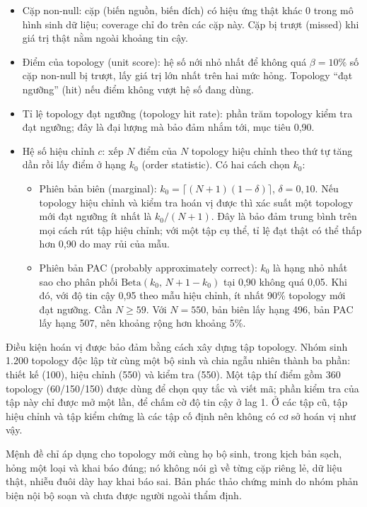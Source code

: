 \documentclass[11pt,a4paper]{article}
\providecommand{\tightlist}{\setlength{\itemsep}{0pt}\setlength{\parskip}{0pt}}
\begin{document}
\begin{itemize}
\tightlist
\item
  Cặp non-null: cặp (biến nguồn, biến đích) có hiệu ứng thật khác 0 trong mô hình sinh dữ liệu; coverage chỉ đo trên các cặp này. Cặp bị trượt (missed) khi giá trị thật nằm ngoài khoảng tin cậy.
\item
  Điểm của topology (unit score): hệ số nới nhỏ nhất để không quá $\beta=10\%$ số cặp non-null bị trượt, lấy giá trị lớn nhất trên hai mức hỏng. Topology ``đạt ngưỡng'' (hit) nếu điểm không vượt hệ số đang dùng.
\item
  Tỉ lệ topology đạt ngưỡng (topology hit rate): phần trăm topology kiểm tra đạt ngưỡng; đây là đại lượng mà bảo đảm nhắm tới, mục tiêu 0,90.
\item
  Hệ số hiệu chỉnh $c$: xếp $N$ điểm của $N$ topology hiệu chỉnh theo thứ tự tăng dần rồi lấy điểm ở hạng $k_0$ (order statistic). Có hai cách chọn $k_0$:

  \begin{itemize}
  \tightlist
  \item
    Phiên bản biên (marginal): $k_0=\lceil (N+1)(1-\delta)\rceil$, $\delta=0{,}10$. Nếu topology hiệu chỉnh và kiểm tra hoán vị được thì xác suất một topology mới đạt ngưỡng ít nhất là $k_0/(N+1)$. Đây là bảo đảm trung bình trên mọi cách rút tập hiệu chỉnh; với một tập cụ thể, tỉ lệ đạt thật có thể thấp hơn 0,90 do may rủi của mẫu.
  \item
    Phiên bản PAC (probably approximately correct): $k_0$ là hạng nhỏ nhất sao cho phân phối $\mathrm{Beta}(k_0,\,N+1-k_0)$ tại 0,90 không quá 0,05. Khi đó, với độ tin cậy 0,95 theo mẫu hiệu chỉnh, ít nhất 90\% topology mới đạt ngưỡng. Cần $N\geq 59$. Với $N=550$, bản biên lấy hạng 496, bản PAC lấy hạng 507, nên khoảng rộng hơn khoảng 5\%.
  \end{itemize}
\end{itemize}

Điều kiện hoán vị được bảo đảm bằng cách xây dựng tập topology. Nhóm sinh 1.200 topology độc lập từ cùng một bộ sinh và chia ngẫu nhiên thành ba phần: thiết kế (100), hiệu chỉnh (550) và kiểm tra (550). Một tập thí điểm gồm 360 topology (60/150/150) được dùng để chọn quy tắc và viết mã; phần kiểm tra của tập này chỉ được mở một lần, để chấm cờ độ tin cậy ở lag 1. Ở các tập cũ, tập hiệu chỉnh và tập kiểm chứng là các tập cố định nên không có cơ sở hoán vị như vậy.

Mệnh đề chỉ áp dụng cho topology mới cùng họ bộ sinh, trong kịch bản sạch, hỏng một loại và khai báo đúng; nó không nói gì về từng cặp riêng lẻ, dữ liệu thật, nhiễu đuôi dày hay khai báo sai. Bản phác thảo chứng minh do nhóm phản biện nội bộ soạn và chưa được người ngoài thẩm định.
\end{document}
